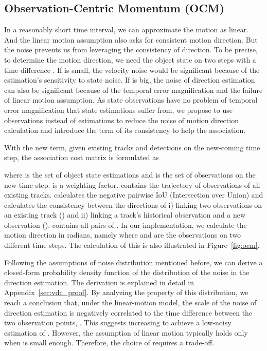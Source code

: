 \documentclass[10pt,twocolumn,letterpaper]{article}
\begin{document}
\subsection{Observation-Centric Momentum (OCM)}
In a reasonably short time interval, we can approximate the motion as linear. And the linear motion assumption also asks for consistent motion direction. But the noise prevents us from leveraging the consistency of direction. To be precise, to determine the motion direction, we need the object state on two steps with a time difference . If  is small, the velocity noise would be significant because of the estimation's sensitivity to state noise. If  is big, the noise of direction estimation can also be significant because of the temporal error magnification and the failure of linear motion assumption.
As state observations have no problem of temporal error magnification that state estimations suffer from, we propose to use observations instead of estimations to reduce the noise of motion direction calculation and introduce the term of its consistency to help the association. 

With the new term, given  existing tracks and  detections on the new-coming time step, the association cost matrix is formulated as

where  is the set of object state estimations and  is the set of observations on the new time step.  is a weighting factor.  contains the trajectory of observations of all existing tracks. 
 calculates the negative pairwise IoU (Intersection over Union) and  calculates the consistency between the directions of i) linking two observations on an existing track () and ii) linking a track's historical observation and a new observation ().  contains all pairs of .
In our implementation, we calculate the motion direction in radians, namely  where  and  are the observations on two different time steps. The calculation of this is also illustrated in Figure~\ref{fig:ocm}.

Following the assumptions of noise distribution mentioned before, we can derive a closed-form probability density function of the distribution of the noise in the direction estimation. The derivation is explained in detail in Appendix~\ref{sec:vdc_proof}. By analyzing the property of this distribution, we reach a conclusion that, under the linear-motion model, the scale of the noise of direction estimation is negatively correlated to the time difference between the two observation points, \ie . This suggests increasing  to achieve a low-noisy estimation of . However, the assumption of linear motion typically holds only when  is small enough. Therefore, the choice of  requires a trade-off.
\end{document}
